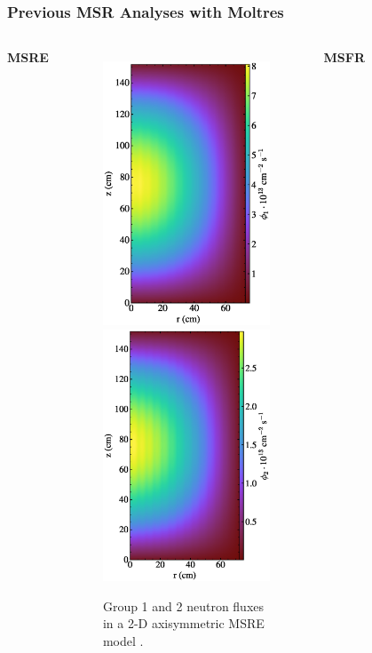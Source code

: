\begin{frame}
  \frametitle{Previous MSR Analyses with Moltres}
  \begin{columns}
    \hfill
    \column[t]{4cm}
      \textbf{\gls{MSRE}}
      \vfill
      \begin{figure}
        \centering
	    \includegraphics[width=.48\columnwidth]{../images/2d_gamma_heating_group1}
        \hfill
	    \includegraphics[width=.48\columnwidth]{../images/2d_gamma_heating_group2}
	    \caption{\footnotesize Group 1 and 2 neutron fluxes in a 2-D axisymmetric MSRE
	      model \cite{lindsay_moltres_2017}.}
      \end{figure}
    \hfill
    \column[t]{3.5cm}
      \textbf{\gls{MSFR}}
      \vfill
      \begin{figure}

\end{figure}
\end{columns}
\end{frame}
